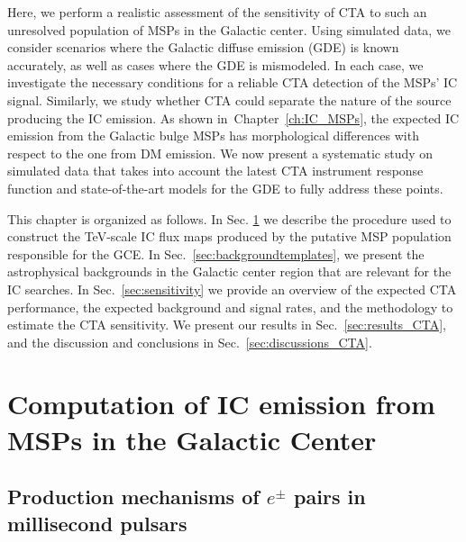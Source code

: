 \documentclass[doublespace,nopageskip]{VTthesis}
\begin{document}
Here, we perform a realistic assessment of the sensitivity of CTA to such an unresolved population of MSPs in the Galactic center. Using simulated data, we consider scenarios where the Galactic diffuse emission (GDE) is known accurately, as well as cases where the GDE is mismodeled. In each case, we investigate the necessary conditions for a reliable CTA detection of the MSPs' IC signal. Similarly, we study whether CTA could separate the nature of the source producing the IC emission. As shown in~Chapter~\ref{ch:IC_MSPs}, the expected IC emission from the Galactic bulge MSPs has morphological differences with respect to the one from DM emission. We now present a systematic study on simulated data that takes into account the latest CTA instrument response function and state-of-the-art models for the GDE to fully address these points.
 
This chapter is organized as follows. In Sec. \ref{sec:ICfromMSPs} we describe the procedure used to construct the TeV-scale IC flux maps produced by the putative MSP population responsible for the GCE. In Sec.~\ref{sec:backgroundtemplates}, we present the astrophysical backgrounds in the Galactic center region that are relevant for the IC searches. In Sec.~\ref{sec:sensitivity} we provide an overview of the expected CTA performance, the expected background and signal rates, and the methodology to estimate the CTA sensitivity. We present our results in Sec.~\ref{sec:results_CTA}, and the discussion and conclusions in Sec.~\ref{sec:discussions_CTA}. 
 
 

\section{Computation of IC emission from MSPs in the Galactic Center}
\label{sec:ICfromMSPs}


\subsection{Production mechanisms of $e^{\pm}$ pairs in millisecond pulsars}
\label{subsec:e+-injection}
\end{document}
